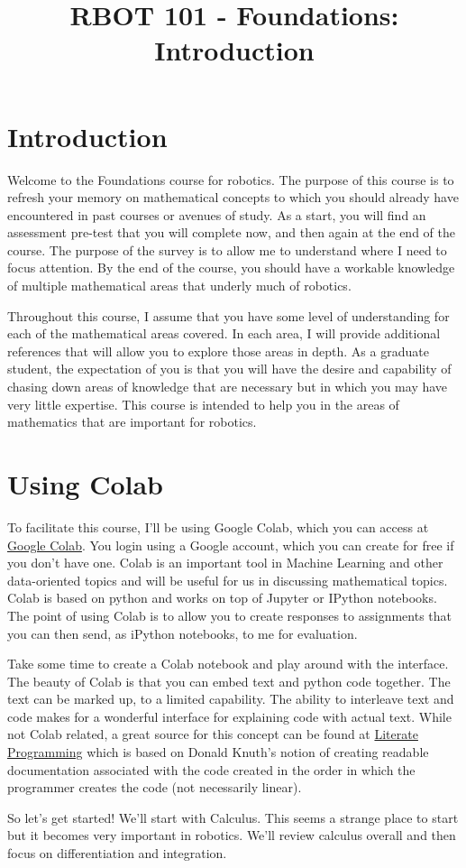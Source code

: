 \documentclass{article}
\title{RBOT 101 - Foundations: Introduction}
\date{}
\author{}
\begin{document}
\maketitle

\section{Introduction}
Welcome to the Foundations course for robotics. The purpose of this course is to refresh your memory on mathematical concepts to which you should already have encountered in past courses or avenues of study. As a start, you will find an assessment pre-test that you will complete now, and then again at the end of the course. The purpose of the survey is to allow me to understand where I need to focus attention. By the end of the course, you should have a workable knowledge of multiple mathematical areas that underly much of robotics.

Throughout this course, I assume that you have some level of understanding for each of the mathematical areas covered. In each area, I will provide additional references that will allow you to explore those areas in depth. As a graduate student, the expectation of you is that you will have the desire and capability of chasing down areas of knowledge that are necessary but in which you may have very little expertise. This course is intended to help you in the areas of mathematics that are important for robotics.

\section{Using Colab}
To facilitate this course, I'll be using Google Colab, which you can access at \href{http://colab.research.google.com}{Google Colab}. You login using a Google account, which you can create for free if you don't have one. Colab is an important tool in Machine Learning and other data-oriented topics and will be useful for us in discussing mathematical topics. Colab is based on python and works on top of Jupyter or IPython notebooks. The point of using Colab is to allow you to create responses to assignments that you can then send, as iPython notebooks, to me for evaluation.

Take some time to create a Colab notebook and play around with the interface. The beauty of Colab is that you can embed text and python code together. The text can be marked up, to a limited capability. The ability to interleave text and code makes for a wonderful interface for explaining code with actual text. While not Colab related, a great source for this concept can be found at \href{http://literateprogramming.com/}{Literate Programming} which is based on Donald Knuth's notion of creating readable documentation associated with the code created in the order in which the programmer creates the code (not necessarily linear).

So let's get started! We'll start with Calculus. This seems a strange place to start but it becomes very important in robotics. We'll review calculus overall and then focus on differentiation and integration.
\end{document}
